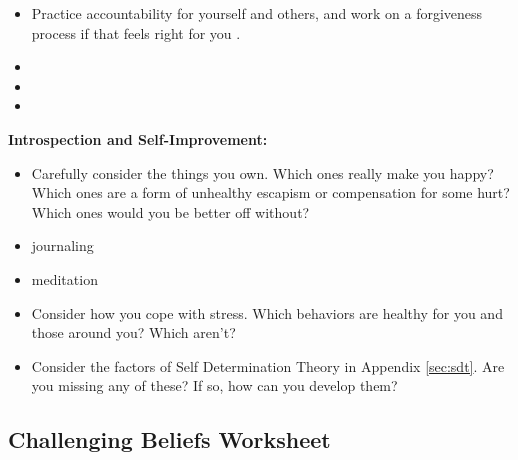 \documentclass[12pt,letterpaper]{article}
\begin{document}
\begin{itemize}
    \item Practice accountability for yourself and others, and work on a forgiveness process if that feels right for you \cite{mingusAccountability,barnardCommunities,gottmanTrust}.  
    \item {}
    \item {} 
    \item {}
\end{itemize}
\noindent \textbf{Introspection and Self-Improvement:} 
\begin{itemize}
    \item Carefully consider the things you own. Which ones really make you happy? Which ones are a form of unhealthy escapism or compensation for some hurt? Which ones would you be better off without? 
    \item journaling
    \item meditation
    \item Consider how you cope with stress. Which behaviors are healthy for you and those around you? Which aren't?
    \item Consider the factors of Self Determination Theory in Appendix \ref{sec:sdt}. Are you missing any of these? If so, how can you develop them?
\end{itemize}
\subsection{Challenging Beliefs Worksheet}
\label{challenge}

\printbibliography
\label{sec:bibliography}
\end{document}
